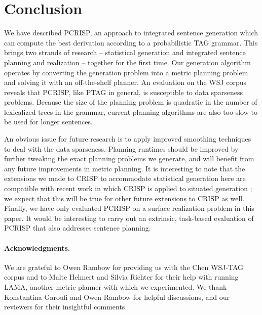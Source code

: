 \section{Conclusion}
\label{sec:conclusion}

We have described PCRISP, an approach to integrated sentence generation which can compute the best derivation according to a probabilistic TAG grammar.  This brings two strands of research -- statistical generation and integrated sentence planning and realization -- together for the first time.  Our generation algorithm operates by converting the generation problem into a metric planning problem and solving it with an off-the-shelf planner.  An evaluation on the WSJ corpus reveals that PCRISP, like PTAG in general, is susceptible to data sparseness problems.  Because the size of the planning problem is quadratic in the number of lexicalized trees in the grammar, current planning algorithms are also too slow to be used for longer sentences.

An obvious issue for future research is to apply improved smoothing techniques to deal with the data sparseness.  Planning runtimes should be improved by further tweaking the exact planning problems we generate, and will benefit from any future improvements in metric planning.  It is interesting to note that the extensions we made to CRISP to accommodate statistical generation here are compatible with recent work in which CRISP is applied to situated generation \cite{garoufikoller2010}; we expect that this will be true for other future extensions to CRISP as well.  Finally, we have only evaluated PCRISP on a surface realization problem in this paper.  It would be interesting to carry out an extrinsic, task-based evaluation of PCRISP that also addresses sentence planning.

\paragraph{Acknowledgments.} We are grateful to Owen Rambow for providing us with the Chen WSJ-TAG corpus and to Malte Helmert and Silvia Richter for their help with running LAMA, another metric planner with which we experimented. We thank Konstantina Garoufi and Owen Rambow for helpful discussions, and our reviewers for their insightful comments.






